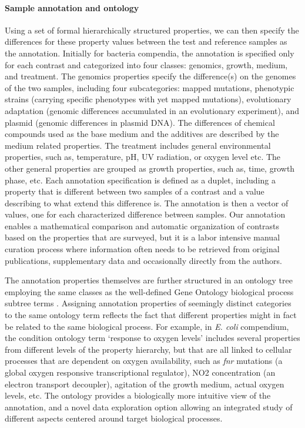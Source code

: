 \paragraph{Sample annotation and ontology}

Using a set of formal hierarchically structured properties, we can then specify the differences for these property values between the test and reference samples as the annotation. Initially for bacteria compendia, the annotation is specified only for each contrast and categorized into four classes: genomics, growth, medium, and treatment. The genomics properties specify the difference(s) on the genomes of the two samples, including four subcategories: mapped mutations, phenotypic strains (carrying specific phenotypes with yet mapped mutations), evolutionary adaptation (genomic differences accumulated in an evolutionary experiment), and plasmid (genomic differences in plasmid DNA). The differences of chemical compounds used as the base medium and the additives are described by the medium related properties. The treatment includes general environmental properties, such as, temperature, pH, UV radiation, or oxygen level etc. The other general properties are grouped as growth properties, such as, time, growth phase, etc. Each annotation specification is defined as a duplet, including a property that is different between two samples of a contrast and a value describing to what extend this difference is. The annotation is then a vector of values, one for each characterized difference between samples. Our annotation enables a mathematical comparison and automatic organization of contrasts based on the properties that are surveyed, but it is a labor intensive manual curation process where information often needs to be retrieved from original publications, supplementary data and occasionally directly from the authors. 

The annotation properties themselves are further structured in an ontology tree employing the same classes as the well-defined Gene Ontology biological process subtree terms \cite{Gene2010}. Assigning annotation properties of seemingly distinct categories to the same ontology term reflects the fact that different properties might in fact be related to the same biological process.  For example, in \textit{E. coli} compendium, the condition ontology term ‘response to oxygen levels’ includes several properties from different levels of the property hierarchy, but that are all linked to cellular processes that are dependent on oxygen availability, such as \textit{fnr} mutations (a global oxygen responsive transcriptional regulator), NO2 concentration (an electron transport decoupler), agitation of the growth medium, actual oxygen levels, etc. The ontology provides a biologically more intuitive view of the annotation, and a novel data exploration option allowing an integrated study of different aspects centered around target biological processes.

